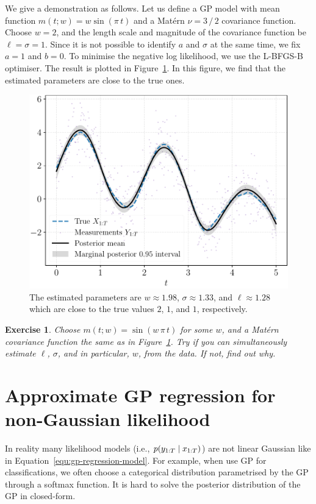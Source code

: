 \documentclass[]{article}
\newtheorem{exercise}[theorem]{Exercise}
\begin{document}
We give a demonstration as follows. Let us define a GP model with mean function $m(t;w) = w \sin(\pi \, t)$ and a Mat\'{e}rn $\nu=3  \, / \, 2$ covariance function. Choose $w = 2$, and the length scale and magnitude of the covariance function be $\ell=\sigma=1$. Since it is not possible to identify $a$ and $\sigma$ at the same time, we fix $a=1$ and $b=0$. To minimise the negative log likelihood, we use the L-BFGS-B optimiser. The result is plotted in Figure~\ref{fig:param-mle}. In this figure, we find that the estimated parameters are close to the true ones. 

\begin{figure}[t!]
	\centering
	\includegraphics[width=.8\linewidth]{figs/param-mle}
	\caption{The estimated parameters are $w\approx 1.98$, $\sigma \approx 1.33$, and $\ell\approx 1.28$ which are close to the true values $2$, $1$, and $1$, respectively.}
	\label{fig:param-mle}
\end{figure}

\begin{exercise}
	Choose $m(t;w) = \sin(w \, \pi \, t)$ for some $w$, and a Mat\'{e}rn covariance function the same as in Figure~\ref{fig:param-mle}. Try if you can simultaneously estimate $\ell$, $\sigma$, and in particular, $w$, from the data. If not, find out why.
\end{exercise}

\section{Approximate GP regression for non-Gaussian likelihood}
\label{sec:approximate-gp-regression}
In reality many likelihood models (i.e., $p(y_{1:T} {\;|\;} x_{1:T})$) are not linear Gaussian like in Equation~\eqref{equ:gp-regression-model}. For example, when use GP for classifications, we often choose a categorical distribution parametrised by the GP through a softmax function. It is hard to solve the posterior distribution of the GP in closed-form.
\end{document}
